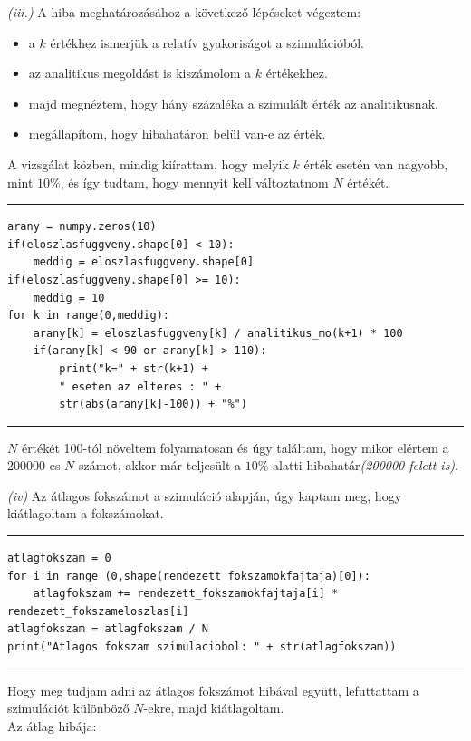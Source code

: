 \documentclass[a4paper, 12pt]{article}
\numberwithin{equation}{section}          %
\numberwithin{figure}{subsection}
\begin{document}
\clearpage
\textit{(iii.)}\newline
A hiba meghatározásához a következő lépéseket végeztem:

\begin{itemize}
	\item a $k$ értékhez ismerjük a relatív gyakoriságot a szimulációból.
	\item az analitikus megoldást is kiszámolom a $k$ értékekhez.
	\item majd megnéztem, hogy hány százaléka a szimulált érték az analitikusnak.
	\item megállapítom, hogy hibahatáron belül van-e az érték.
\end{itemize}


A vizsgálat közben, mindig kiírattam, hogy melyik $k$ érték esetén van nagyobb, mint $10\%$, és így tudtam, hogy mennyit kell változtatnom  $N$ értékét. 
\newline
\rule{\textwidth}{0.1pt}
\begin{lstlisting}
arany = numpy.zeros(10)
if(eloszlasfuggveny.shape[0] < 10):
	meddig = eloszlasfuggveny.shape[0]
if(eloszlasfuggveny.shape[0] >= 10):
	meddig = 10
for k in range(0,meddig):
	arany[k] = eloszlasfuggveny[k] / analitikus_mo(k+1) * 100
	if(arany[k] < 90 or arany[k] > 110):
		print("k=" + str(k+1) +
		" eseten az elteres : " +
		str(abs(arany[k]-100)) + "%")
\end{lstlisting}
\rule{\textwidth}{0.1pt}

$N$ értékét 100-tól növeltem folyamatosan és úgy találtam, hogy mikor elértem a 200000 es $N$ számot, akkor már teljesült a $10\%$ alatti hibahatár\textit{(200000 felett is)}.

\clearpage
\textit{(iv)}\newline
Az átlagos fokszámot a szimuláció alapján, úgy kaptam meg, hogy kiátlagoltam a fokszámokat.
\newline
\rule{\textwidth}{0.1pt}
\begin{lstlisting}
atlagfokszam = 0
for i in range (0,shape(rendezett_fokszamokfajtaja)[0]):
	atlagfokszam += rendezett_fokszamokfajtaja[i] * rendezett_fokszameloszlas[i]
atlagfokszam = atlagfokszam / N
print("Atlagos fokszam szimulaciobol: " + str(atlagfokszam))
\end{lstlisting}
\rule{\textwidth}{0.1pt}


Hogy meg tudjam adni az átlagos fokszámot hibával együtt, lefuttattam a szimulációt különböző $N$-ekre, majd kiátlagoltam.\\
Az átlag hibája:
\end{document}
